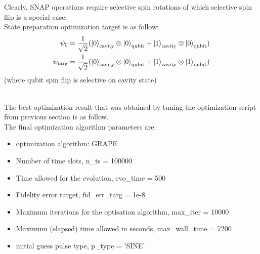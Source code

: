 \documentclass[12pt]{article}
\begin{document}
Clearly, SNAP operations require selective spin rotations of which selective spin flip is a special case.
\\
State preparation optimization target is as follow: 
\begin{align*}
    \psi_0 &= \frac{1}{\sqrt{2}} (\ket{0}_{\text{cavity}} \otimes \ket{0}_{\text{qubit}} 
                + \ket{1}_{\text{cavity}} \otimes \ket{0}_{\text{qubit}})\\
    \psi_{\text{targ}} &= \frac{1}{\sqrt{2}} (\ket{0}_{\text{cavity}} \otimes \ket{0}_{\text{qubit}} 
                + \ket{1}_{\text{cavity}} \otimes \ket{1}_{\text{qubit}})\\
\end{align*}
(where qubit spin flip is selective on cavity state)

\\

The best optimization result that was obtained by tuning the optimization script from 
previous section is as follow. 
\\
The final optimization algorithm parameters are:
\\ 
\begin{itemize}
    \item optimization algorithm: GRAPE
    \item Number of time slots, n\_ts = 100000
    \item Time allowed for the evolution, evo\_time = 500
    \item Fidelity error target, fid\_err\_targ = 1e-8
    \item Maximum iterations for the optisation algorithm, max\_iter = 10000
    \item Maximum (elapsed) time allowed in seconds, max\_wall\_time = 7200
    \item initial guess pulse type, p\_type = 'SINE'
\end{itemize}
\end{document}
